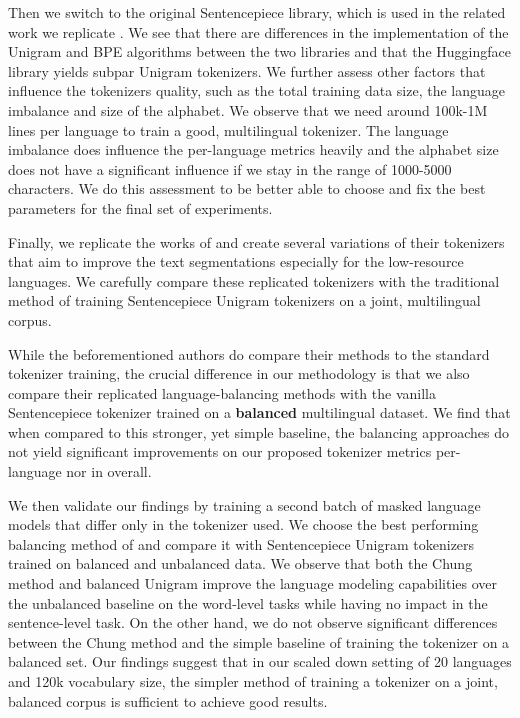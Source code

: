 Then we switch to the original Sentencepiece library, which is used in the related work we replicate \cite{conneau_unsupervised_2020,chung_improving_2020,zheng_allocating_2021,liang_xlm-v_2023}. We see that there are differences in the implementation of the Unigram and BPE algorithms between the two libraries and that the Huggingface library yields subpar Unigram tokenizers. We further assess other factors that influence the tokenizers quality, such as the total training data size, the language imbalance and size of the alphabet. We observe that we need around 100k-1M lines per language to train a good, multilingual tokenizer. The language imbalance does influence the per-language metrics heavily and the alphabet size does not have a significant influence if we stay in the range of 1000-5000 characters. We do this assessment to be better able to choose and fix the best parameters for the final set of experiments.

Finally, we replicate the works of \citet{chung_improving_2020,zheng_allocating_2021,liang_xlm-v_2023} and create several variations of their tokenizers that aim to improve the text segmentations especially for the low-resource languages. We carefully compare these replicated tokenizers with the traditional method of training Sentencepiece Unigram tokenizers on a joint, multilingual corpus. 

While the beforementioned authors do compare their methods to the standard tokenizer training, the crucial difference in our methodology is that we also compare their replicated language-balancing methods with the vanilla Sentencepiece tokenizer trained on a \textbf{balanced} multilingual dataset. We find that when compared to this stronger, yet simple baseline, the balancing approaches do not yield significant improvements on our proposed tokenizer metrics per-language nor in overall.

We then validate our findings by training a second batch of masked language models that differ only in the tokenizer used. We choose the best performing balancing method of \citet{chung_improving_2020} and compare it with Sentencepiece Unigram tokenizers trained on balanced and unbalanced data. We observe that both the Chung method and balanced Unigram improve the language modeling capabilities over the unbalanced baseline on the word-level tasks while having no impact in the sentence-level task. On the other hand, we do not observe significant differences between the Chung method and the simple baseline of training the tokenizer on a balanced set. Our findings suggest that in our scaled down setting of 20 languages and 120k vocabulary size, the simpler method of training a tokenizer on a joint, balanced corpus is sufficient to achieve good results.

